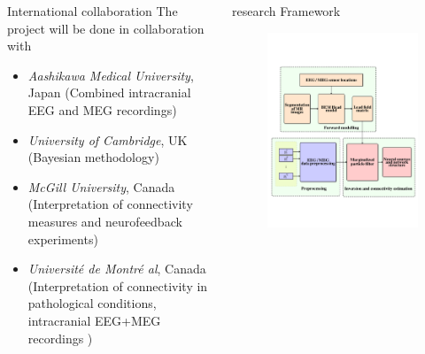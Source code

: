 \documentclass[serif,final]{beamer}
\begin{document}
\begin{frame}{}
\begin{columns}[t]
\begin{column}{0.45\linewidth}
	\begin{block}{International collaboration}
        The project will be done in collaboration with 
        \begin{itemize}
    		    \small
        		\item \textit{Aashikawa Medical University}, Japan (Combined intracranial EEG and MEG recordings)
	        \item \textit{University of Cambridge}, UK (Bayesian methodology)
    		    \item \textit{McGill University}, Canada (Interpretation of connectivity measures and neurofeedback experiments)
    		    \item  \textit{Universit\'e de Montr\'e al}, Canada (Interpretation of connectivity in pathological conditions, intracranial EEG+MEG recordings )
        \end{itemize}      
    \end{block}
    \end{column}%

    \begin{column}{0.5\linewidth}

      \begin{block}{research Framework}     
 	  \begin{figure}
    		    \vspace{2cm}
       		 \centering    
	         \includegraphics[width = 0.4\linewidth]{framework_ver2}
        \end{figure}
       

\end{block}
\end{column}
\end{columns}
\end{frame}
\end{document}
